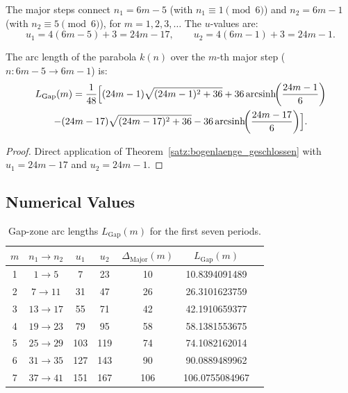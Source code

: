 The major steps connect $n_1 = 6m-5$ (with $n_1 \equiv 1 \pmod{6}$) and
$n_2 = 6m-1$ (with $n_2 \equiv 5 \pmod{6}$), for $m = 1, 2, 3, \ldots$
The $u$-values are:
\[
  u_1 = 4(6m-5)+3 = 24m - 17,
  \qquad
  u_2 = 4(6m-1)+3 = 24m - 1.
\]

\begin{theorem}\label{satz:gap_zone}
The arc length of the parabola $k(n)$ over the $m$-th major step
($n: 6m-5 \to 6m-1$) is:
\begin{multline}
  L_{\mathrm{Gap}}(m)
  = \frac{1}{48}\Bigl[
      (24m-1)\sqrt{(24m-1)^2+36}
    + 36\operatorname{arcsinh}\!\!\left(\frac{24m-1}{6}\right)
    \\
    - (24m-17)\sqrt{(24m-17)^2+36}
    - 36\operatorname{arcsinh}\!\!\left(\frac{24m-17}{6}\right)
    \Bigr].
\end{multline}
\end{theorem}

\begin{proof}
Direct application of Theorem~\ref{satz:bogenlaenge_geschlossen} with
$u_1 = 24m-17$ and $u_2 = 24m-1$.
\end{proof}

\subsection{Numerical Values}

\begin{table}[H]
\centering
\caption{Gap-zone arc lengths $L_{\mathrm{Gap}}(m)$ for the first
  seven periods.}
\renewcommand{\arraystretch}{1.2}
\begin{tabular}{ccccccc}
\toprule
$m$ & $n_1 \to n_2$ & $u_1$ & $u_2$ &
$\Delta_{\mathrm{Major}}(m)$ & $L_{\mathrm{Gap}}(m)$ \\
\midrule
1 &  $1 \to  5$ &  7 & 23 & 10 &  10.8394091489 \\
2 &  $7 \to 11$ & 31 & 47 & 26 &  26.3101623759 \\
3 & $13 \to 17$ & 55 & 71 & 42 &  42.1910659377 \\
4 & $19 \to 23$ & 79 & 95 & 58 &  58.1381553675 \\
5 & $25 \to 29$ & 103 & 119 & 74 & 74.1082162014 \\
6 & $31 \to 35$ & 127 & 143 & 90 & 90.0889489962 \\
7 & $37 \to 41$ & 151 & 167 & 106 & 106.0755084967 \\
\bottomrule
\end{tabular}
\end{table}

